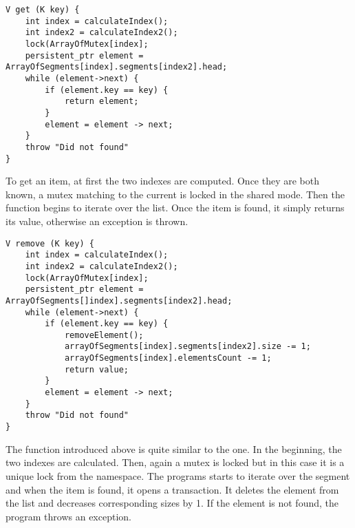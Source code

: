 \begin{lstlisting}[caption={\getMethod method}]
V get (K key) {
    int index = calculateIndex();
    int index2 = calculateIndex2();
    lock(ArrayOfMutex[index];
    persistent_ptr element = ArrayOfSegments[index].segments[index2].head;
    while (element->next) {
        if (element.key == key) {
            return element;
        }
        element = element -> next;
    } 
    throw "Did not found"
}
\end{lstlisting}
        To get an item, at first the two indexes are computed. 
        Once they are both known, a mutex matching to the current \ArrayOfSegments is locked in the shared mode. 
        Then the function begins to iterate over the list. 
        Once the item is found, it simply returns its value, otherwise an exception is thrown.
        
                
\begin{lstlisting}[caption={\removeMethod method}]
V remove (K key) {
    int index = calculateIndex();
    int index2 = calculateIndex2();
    lock(ArrayOfMutex[index];
    persistent_ptr element = ArrayOfSegments[]index].segments[index2].head;
    while (element->next) {
        if (element.key == key) {
            removeElement();
            arrayOfSegments[index].segments[index2].size -= 1;
            arrayOfSegments[index].elementsCount -= 1;
            return value;
        }
        element = element -> next;
    } 
    throw "Did not found"
}
\end{lstlisting}
        The \removeMethod function introduced above is quite similar to the \get one. 
        In the beginning, the two indexes are calculated. 
        Then, again a mutex is locked but in this case it is a  unique lock from the \std namespace.
        The programs starts to iterate over the segment and when the item is found, it opens a transaction. 
        It deletes the element from the list and decreases corresponding sizes by 1.
        If the element is not found, the program throws an exception.
            
            
    


